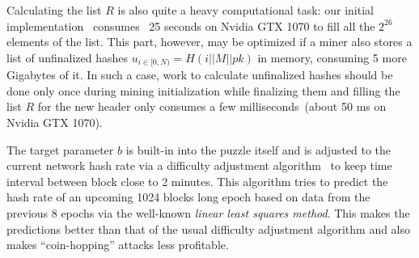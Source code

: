 Calculating the list $R$ is also quite a heavy computational task: our initial implementation~\cite{ergoMiner}
consumes ~25 seconds on Nvidia GTX 1070 to fill all the $2^{26}$ elements of the list.
This part, however, may be optimized if a miner also stores a list of unfinalized hashes $u_{i \in [0,N)}=H(i||M||pk)$
in memory, consuming 5 more Gigabytes of it. In such a case, work to calculate unfinalized hashes should
be done only once during mining initialization while finalizing them and filling the list $R$
for the new header only consumes a few milliseconds~(about 50 ms on Nvidia GTX 1070).

The target parameter $b$ is built-in into the puzzle itself
and is adjusted to the current network hash rate via a difficulty adjustment
algorithm~\cite{meshkov2017short} to keep time interval between block close to 2 minutes.
This algorithm tries to predict the hash rate of an upcoming 1024 blocks long epoch
based on data from the previous 8 epochs via the well-known {\em linear least squares method}. This makes the predictions better than that of the usual difficulty adjustment algorithm and also makes ``coin-hopping'' attacks less profitable.
